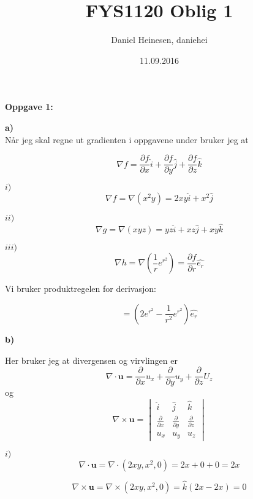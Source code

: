 \documentclass[a4paper,norsk,11pt,twoside]{article}
\date{11.09.2016}
\title{FYS1120 Oblig 1}
\author{Daniel Heinesen, daniehei}
\begin{document}
\maketitle
\newpage

\textbf{Oppgave 1:}

\textbf{a)}\\

Når jeg skal regne ut gradienten i oppgavene under bruker jeg at 

\begin{equation}
\nabla f =  \frac{\partial f}{\partial x}\hat{i} + \frac{\partial f}{\partial y}\hat{j} + \frac{\partial f}{\partial z}\hat{k}
\end{equation}

$i)$\\

$$
\nabla f=\nabla(x^{2}y) = 2xy\hat{i} + x^{2}\hat{j}
$$

$ii)$\\

$$
\nabla g=\nabla(xyz) = yz\hat{i} + xz\hat{j} + xy\hat{k}
$$

$iii)$\\

 

$$
\nabla h=\nabla(\frac{1}{r} e^{r^{2}}) = \frac{\partial f}{\partial r} \hat{e_r}
$$

Vi bruker produktregelen for derivasjon:

$$
= (2e^{r^{2}} - \frac{1}{r^{2}}e^{r^{2}})\hat{e_r}
$$

\textbf{b)}

Her bruker jeg at divergensen og virvlingen er
\begin{equation}
\nabla \cdot \textbf{u} = \frac{\partial}{\partial x} u_x + \frac{\partial}{\partial y} u_y + \frac{\partial}{\partial z} U_z
\end{equation}
og
\begin{equation}
\nabla\times\textbf{u}
=\begin{vmatrix}
\hat i & \hat j & \hat k \\
\frac{\partial}{\partial x} & \frac{\partial}{\partial y} & \frac{\partial}{\partial z} \\
u_x & u_y & u_z
\end{vmatrix}
\end{equation}

$i)$\\
$$
\nabla \cdot \textbf{u} = \nabla \cdot (2xy,x^{2},0) = 2x + 0 + 0 = 2x
$$

$$
\nabla\times \textbf{u} = \nabla \times(2xy,x^{2},0) = \hat{k}(2x-2x) = 0
$$
\end{document}
